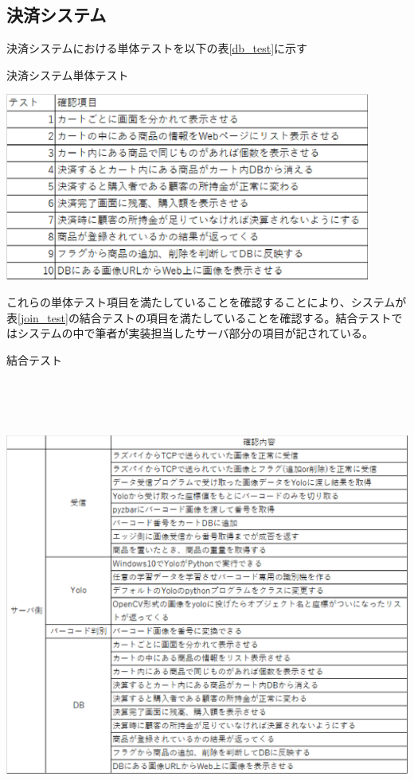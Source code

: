 \subsection*{決済システム}
決済システムにおける単体テストを以下の表\ref{db_test}に示す
\begin{table}[htbp]
\centering
\caption{決済システム単体テスト}
\includegraphics[width=12cm]{./pic/db_test.eps}
\label{db_test}
\end{table}

\newpage

これらの単体テスト項目を満たしていることを確認することにより、システムが表\ref{join_test}の結合テストの項目を満たしていることを確認する。結合テストではシステムの中で筆者が実装担当したサーバ部分の項目が記されている。

\begin{table}[htbp]
\centering
\caption{結合テスト}
\includegraphics[height=15cm,width=15cm]{./pic/join_test.eps}
\label{join_test}
\end{table}

